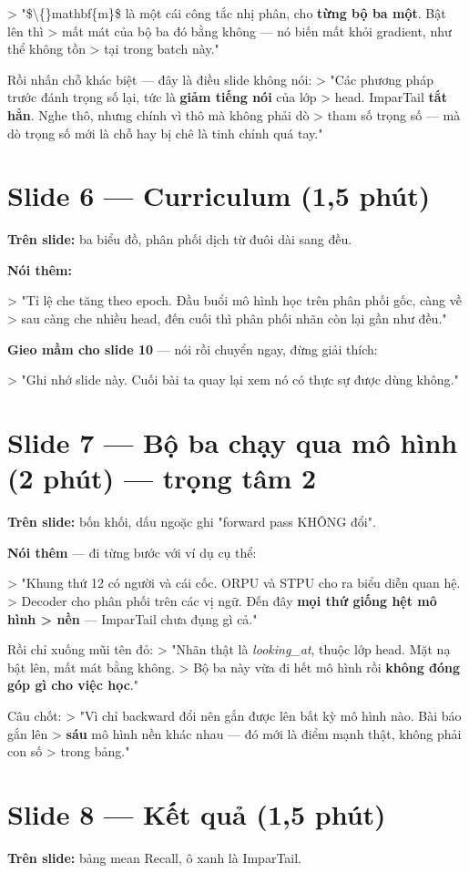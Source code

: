 \documentclass[11pt,a4paper]{article}
\begin{document}
> "\$\textbackslash\{\}mathbf\{m\}\$ là một cái công tắc nhị phân, cho \textbf{từng bộ ba một}. Bật lên thì > mất mát của bộ ba đó bằng không --- nó biến mất khỏi gradient, như thể không tồn > tại trong batch này."

Rồi nhấn chỗ khác biệt --- đây là điều slide không nói: > "Các phương pháp trước đánh trọng số lại, tức là \textbf{giảm tiếng nói} của lớp > head. ImparTail \textbf{tắt hẳn}. Nghe thô, nhưng chính vì thô mà không phải dò > tham số trọng số --- mà dò trọng số mới là chỗ hay bị chê là tinh chỉnh quá tay."

\section{Slide 6 --- Curriculum (1,5 phút)}
\textbf{Trên slide:} ba biểu đồ, phân phối dịch từ đuôi dài sang đều.

\textbf{Nói thêm:}

> "Tỉ lệ che tăng theo epoch. Đầu buổi mô hình học trên phân phối gốc, càng về > sau càng che nhiều head, đến cuối thì phân phối nhãn còn lại gần như đều."

\textbf{Gieo mầm cho slide 10} --- nói rồi chuyển ngay, đừng giải thích:

> "Ghi nhớ slide này. Cuối bài ta quay lại xem nó có thực sự được dùng không."

\section{Slide 7 --- Bộ ba chạy qua mô hình (2 phút) --- trọng tâm 2}
\textbf{Trên slide:} bốn khối, dấu ngoặc ghi "forward pass KHÔNG đổi".

\textbf{Nói thêm} --- đi từng bước với ví dụ cụ thể:

> "Khung thứ 12 có người và cái cốc. ORPU và STPU cho ra biểu diễn quan hệ. > Decoder cho phân phối trên các vị ngữ. Đến đây \textbf{mọi thứ giống hệt mô hình > nền} --- ImparTail chưa đụng gì cả."

Rồi chỉ xuống mũi tên đỏ: > "Nhãn thật là \emph{looking\_at}, thuộc lớp head. Mặt nạ bật lên, mất mát bằng không. > Bộ ba này vừa đi hết mô hình rồi \textbf{không đóng góp gì cho việc học}."

Câu chốt: > "Vì chỉ backward đổi nên gắn được lên bất kỳ mô hình nào. Bài báo gắn lên > \textbf{sáu} mô hình nền khác nhau --- đó mới là điểm mạnh thật, không phải con số > trong bảng."

\section{Slide 8 --- Kết quả (1,5 phút)}
\textbf{Trên slide:} bảng mean Recall, ô xanh là ImparTail.
\end{document}
